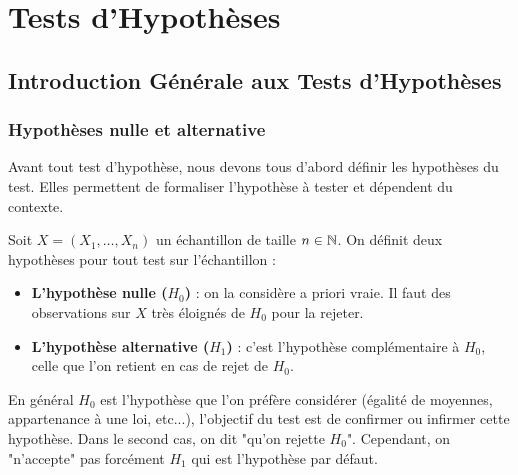 \chapter{Tests d'Hypothèses}








\section{Introduction Générale aux Tests d'Hypothèses}

\subsection{Hypothèses nulle et alternative}

Avant tout test d'hypothèse, nous devons tous d'abord définir les hypothèses du test. 
Elles permettent de formaliser l'hypothèse à tester et dépendent du contexte. 

\begin{definition}
    Soit $X = (X_1, \dots, X_n)$ un échantillon de taille $n \in \mathbb{N}$. On définit deux hypothèses pour tout test sur 
    l'échantillon : 
    \begin{itemize}
        \item \textbf{L'hypothèse nulle ($H_0$)} : on la considère a priori vraie. Il faut des observations sur $X$ très 
         éloignés de $H_0$ pour la rejeter. 
        \item \textbf{L'hypothèse alternative ($H_1$)} : c'est l'hypothèse complémentaire à $H_0$, celle que l'on 
        retient en cas de rejet de $H_0$. 
    \end{itemize}
\end{definition}

En général $H_0$ est l'hypothèse que l'on préfère considérer (égalité de moyennes, appartenance à une loi, etc...), 
l'objectif du test est de confirmer ou infirmer cette hypothèse. Dans le second cas, on dit "qu'on rejette $H_0$". 
Cependant, on "n'accepte" pas forcément $H_1$ qui est l'hypothèse par défaut. 


